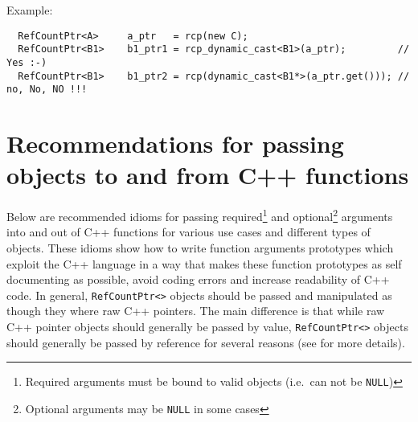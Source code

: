 \documentclass[pdf,ps2pdf,11pt]{SANDreport}
\begin{document}
{}\noindent{}Example:
{\small\begin{verbatim}
  RefCountPtr<A>     a_ptr   = rcp(new C);
  RefCountPtr<B1>    b1_ptr1 = rcp_dynamic_cast<B1>(a_ptr);         // Yes :-)
  RefCountPtr<B1>    b1_ptr2 = rcp(dynamic_cast<B1*>(a_ptr.get())); // no, No, NO !!!
\end{verbatim}}

%
\section{Recommendations for passing objects to and from C++ functions}
\label{rcpqs:apdx:passing-args}
%

Below are recommended idioms for passing required\footnote{Required
arguments must be bound to valid objects (i.e.~can not be
{}\texttt{NULL})} and optional\footnote{Optional arguments may be
{}\texttt{NULL} in some cases} arguments into and out of C++ functions
for various use cases and different types of objects.  These idioms
show how to write function arguments prototypes which exploit the C++
language in a way that makes these function prototypes as self
documenting as possible, avoid coding errors and increase readability
of C++ code.  In general, {}\texttt{Ref\-Count\-Ptr<>} objects should
be passed and manipulated as though they where raw C++ pointers.  The
main difference is that while raw C++ pointer objects should generally
be passed by value, {}\texttt{Ref\-Count\-Ptr<>} objects should
generally be passed by reference for several reasons (see
{}\cite{ref:RefCountPtr} for more details).
\end{document}

